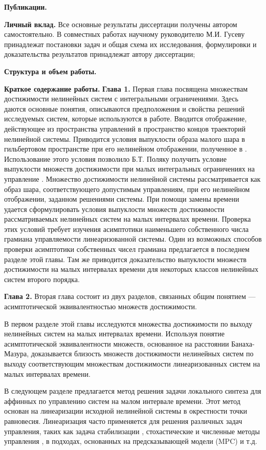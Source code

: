 \documentclass[../main.tex]{subfiles}
\begin{document}
\textbf{Публикации.}

\textbf{Личный вклад.} Все основные результаты диссертации получены автором самостоятельно.  В совместных работах научному руководителю М.И. Гусеву принадлежат постановки задач и общая схема их исследования, формулировки и доказательства результатов принадлежат автору диссертации;

\textbf{Структура и объем работы.}

\textbf{Краткое содержание работы.}  \textbf{Глава 1. } 
Первая глава посвящена множествам достижимости нелинейных систем с интегральными ограничениями. 
Здесь даются основные понятия, описываются предположения и свойства решений исследуемых систем, которые используются в работе. 
Вводится отображение, действующее из пространства управлений в пространство концов траекторий нелинейной системы. 
Приводится условия выпуклости образа малого шара в гильбертовом пространстве при его нелинейном отображении, полученное в \cite{Polyak2001}. 
Использование этого условия позволило Б.Т. Поляку получить условие выпуклости множеств достижимости при малых интегральных ограничениях на управление \cite{Polyak2004}.
Множество достижимости нелинейной системы рассматривается как образ шара, соответствующего допустимым управлениям, при его нелинейном отображении, заданном решениями системы.
При помощи замены времени удается сформулировать условия выпуклости множеств достижимости рассматриваемых нелинейных систем на малых интервалах времени. 
Проверка этих условий требует изучения асимптотики наименьшего собственного числа грамиана управляемости линеаризованной системы.
Один из возможных способов проверки асимптотики собственных чисел грамиана предлагается в последнем разделе этой главы. 
Там же приводится доказательство выпуклости множеств достижимости на малых интервалах времени для некоторых классов нелинейных систем второго порядка. 

\textbf{Глава 2. }
Вторая глава состоит из двух разделов, связанных общим понятием --- асимптотической эквивалентностью множеств достижимости. 

В первом разделе этой главы исследуются множества достижимости по выходу нелинейных систем на малых интервалах времени.
Используя понятие асимптотической эквивалентности множеств\cite{Ovs}, основанное на расстоянии Банаха-Мазура\cite{Thompson}, доказывается близость множеств достижимости нелинейных систем по выходу соответствующим множествам достижимости линеаризованных систем на малых интервалах времени. 

В следующем разделе предлагается метод решения задачи локального синтеза для аффинных по управлению систем на малом интервале времени.  
Этот метод основан на линеаризации исходной нелинейной системы в окрестности точки равновесия. 
Линеаризация часто применяется для решения различных задач управления, таких как задача стабилизации \cite{Kras_add,Khalil}, стохастические и численные методы управления \cite{Roxin,EKF,denBerg,Pang}, в подходах, основанных на предсказывающей модели (MPC) \cite{Murillo,LTV_MPC} и т.д.
\end{document}
